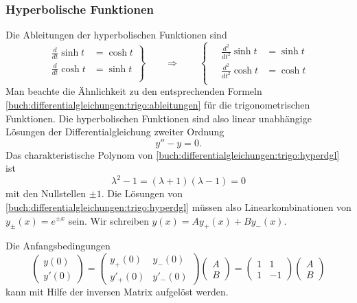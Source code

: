 \subsubsection{Hyperbolische Funktionen}
Die Ableitungen der hyperbolischen Funktionen sind
\begin{equation}
\left.
\begin{aligned}
\frac{d}{dt} \sinh t & = \cosh t \\
\frac{d}{dt} \cosh t & = \sinh t\\
\end{aligned}
\right\}
\qquad\Rightarrow\qquad
\left\{\quad
\begin{aligned}
\frac{d^2}{dt^2}\sinh t&=\sinh t\\
\frac{d^2}{dt^2}\cosh t&=\cosh t\\
\end{aligned}\right.
\label{buch:differentialgleichungen:trigo:hyperabl}
\end{equation}
Man beachte die Ähnlichkeit zu den entsprechenden Formeln
\eqref{buch:differentialgleichungen:trigo:ableitungen}
für die trigonometrischen Funktionen.
Die hyperbolischen Funktionen sind also linear unabhängige Lösungen
der Differentialgleichung zweiter Ordnung
\begin{equation}
y'' -y = 0.
\label{buch:differentialgleichungen:trigo:hyperdgl}
\end{equation}
Das charakteristische Polynom von
\eqref{buch:differentialgleichungen:trigo:hyperdgl}
ist
\[
\lambda^2-1 = (\lambda+1)(\lambda-1) = 0
\]
mit den Nullstellen $\pm 1$.
Die Lösungen von
\eqref{buch:differentialgleichungen:trigo:hyperdgl}
müssen also Linearkombinationen von $y_{\pm}(x)=e^{\pm x}$ sein.
Wir schreiben $y(x)=Ay_+(x)+By_-(x)$.

Die Anfangsbedingungen 
\[
\begin{pmatrix}
 y(0)\\
y'(0)
\end{pmatrix}
=
\begin{pmatrix}
 y_+(0) &  y_-(0) \\
y'_+(0) & y'_-(0) 
\end{pmatrix}
\begin{pmatrix}
A\\B
\end{pmatrix}
=
\begin{pmatrix}
  1     &    1    \\
  1     &   -1
\end{pmatrix}
\begin{pmatrix}
A\\B
\end{pmatrix}
\]
kann mit Hilfe der inversen Matrix aufgelöst werden.

